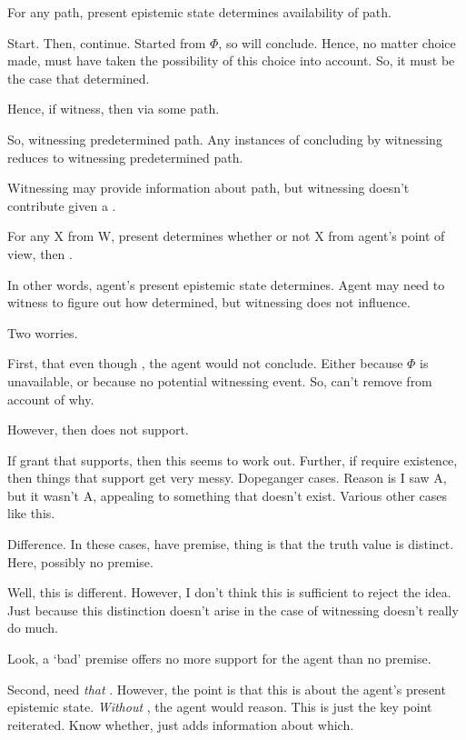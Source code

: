 \begin{note}
  \begin{proposition}
    For any path, present epistemic state determines availability of path.
  \end{proposition}

  Start.
  Then, continue.
  Started from \(\Phi\), so will conclude.
  Hence, no matter choice made, must have taken the possibility of this choice into account.
  So, it must be the case that determined.

  Hence, if witness, then via some path.

  So, witnessing predetermined path.
  Any instances of concluding by witnessing reduces to witnessing predetermined path.

  Witnessing may provide information about path, but witnessing doesn't contribute given a \requ{}.

  For any X from W,
  present determines whether or not X from agent's point of view, then \fc{}.

  In other words, agent's present epistemic state determines.
  Agent may need to witness to figure out how determined, but witnessing does not influence.
\end{note}

\begin{note}
  Two worries.

  First, that even though , the agent would not conclude.
  Either because \(\Phi\) is unavailable, or because no potential witnessing event.
  So, can't remove  from account of why.

  However, then  does not support.

  If grant that  supports, then this seems to work out.
  Further, if require existence, then things that support get very messy.
  Dopeganger cases.
  Reason is I saw A, but it wasn't A, appealing to something that doesn't exist.
  Various other cases like this.

  Difference.
  In these cases, have premise, thing is that the truth value is distinct.
  Here, possibly no premise.

  Well, this is different.
  However, I don't think this is sufficient to reject the idea.
  Just because this distinction doesn't arise in the case of witnessing doesn't really do much.

  Look, a `bad' premise offers no more support for the agent than no premise.

  Second, need \emph{that} .
  However, the point is that this is about the agent's present epistemic state.
  \emph{Without} , the agent would reason.
  This is just the key point reiterated.
  Know whether,  just adds information about which.
\end{note}

